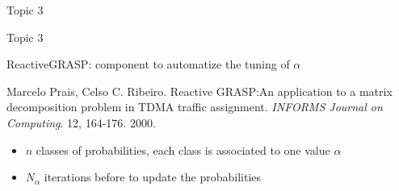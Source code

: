 \documentclass[10pt,xcolor=dvipsnames]{beamer}
\begin{document}

\begin{frame}[standout]

Topic 3

\end{frame}

\begin{frame}{Topic 3}

ReactiveGRASP: component to automatize the tuning of $\alpha$

{\tiny Marcelo Prais, Celso C. Ribeiro. Reactive GRASP:An application to a matrix decomposition problem in TDMA traffic assignment.
\textit{INFORMS Journal on Computing}. 12, 164-176. 2000.

}


\begin{itemize}
\item $n$ classes of probabilities, each class is associated to one value $\alpha$ 
\item $N_\alpha$ iterations before to update the probabilities
\end{itemize}

\end{frame}
\end{document}
